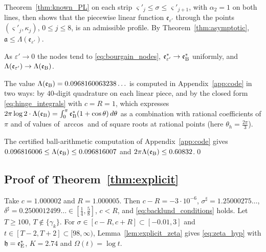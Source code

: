 \documentclass[11pt,a4paper]{article}
\makeatletter
\numberwithin{equation}{section}
\DeclareRobustCommand{\CGref}[1]{\ref{#1}}
\DeclareRobustCommand{\CGeqref}[1]{\eqref{#1}}
\let\CG@origref\ref
\let\CG@origeqref\eqref
\newcommand{\CG@gettip}[1]{\@ifundefined{CGTip@#1}{#1}{\csname CGTip@#1\endcsname}}
\DeclareRobustCommand{\CGref}[1]{\pdftooltip{\CG@origref{#1}}{\CG@gettip{#1}}}
\DeclareRobustCommand{\CGeqref}[1]{\pdftooltip{\CG@origeqref{#1}}{\CG@gettip{#1}}}
\theoremstyle{definition}
\theoremstyle{remark}
\newcommand{\eB}{\mathfrak e_{\rm B}}
\newcommand{\eE}{\mathfrak e_{\rm E}}
\makeatother
\begin{document}
Theorem~\CGref{thm:known_PL} on each strip $\varsigma'_j\le\sigma\le\varsigma'_{j+1}$, with $\alpha_2=1$ on both lines, then shows that the piecewise linear function $\mathfrak e_{\varepsilon'}$ through the points $(\varsigma'_j,\kappa_j)$, $0\le j\le8$, is an admissible profile. By Theorem~\CGref{thm:asymptotic}, $\mathfrak a\le\Lambda(\mathfrak e_{\varepsilon'})$.

As $\varepsilon'\to0$ the nodes tend to \CGeqref{eq:bourgain_nodes}, $\mathfrak e^*_{\varepsilon'}\to\eB^*$ uniformly, and $\Lambda(\mathfrak e_{\varepsilon'})\to\Lambda(\eB)$.

The value $\Lambda(\eB)=0.0968160063238\ldots$ is computed in Appendix~\CGref{app:code} in two ways: by $40$-digit quadrature on each linear piece, and by the closed form \CGeqref{eq:hinge_integrals} with $c=R=1$, which expresses $2\pi\log2\cdot\Lambda(\eB)=\int_0^\pi\eB^*(1+\cos\theta)\,d\theta$ as a combination with rational coefficients of $\pi$ and of values of $\arccos$ and of square roots at rational points (here $\theta_h=\frac{2\pi}3$).

The certified ball-arithmetic computation of Appendix~\CGref{app:code} gives $0.096816006\le\Lambda(\eB)\le0.096816007$ and $2\pi\Lambda(\eB)\le0.60832$.\qed

\subsection{Proof of Theorem~\ref{thm:explicit}}\label{subsec:proof_explicit}
Take $c=1.000002$ and $R=1.000005$. Then $c-R=-3\cdot10^{-6}$, $\sigma^\sharp=1.25000275\ldots$, $\delta^\sharp=0.2500012499\ldots\in[\frac14,\frac58]$, $c<R$, and \CGeqref{eq:backlund_conditions} holds. Let $T\ge100$, $T\notin\{\gamma_k\}$. For $\sigma\in[c-R,c+R]\subset[-0.01,3]$ and $t\in[T-2,T+2]\subset[98,\infty)$, Lemma~\CGref{lem:explicit_zeta} gives \CGeqref{eq:zeta_hyp} with $\mathfrak h=\eE^*$, $K=2.74$ and $\Omega(t)=\log t$.
\end{document}
